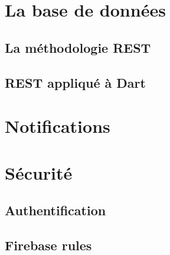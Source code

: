 \section{La base de données}
\subsection{La méthodologie REST}
\subsection{REST appliqué à Dart}


\section{Notifications}



\section{Sécurité}

\subsection{Authentification}

\subsection{Firebase rules}
